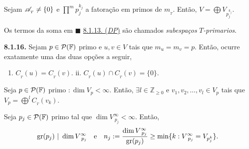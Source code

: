 \hypertarget{thmDP}{}
\begin{theorem}
    \label{thm:8.1.13}
    Sejam \(\mathscr{A}_{_T}\neq \{0\}\) e \(\prod^m p_j^{k_j}\) a fatoração em primos de \(m_{_T}\). Então, \(V= \bigoplus V_{p_j^{k_j}}\). 
\end{theorem}


\begin{note}
    Os termos da soma em \(\blacksquare\) \hyperlink{thmDP}{8.1.13. (\emph{DP})} são chamados \emph{subespaços} \(T\)\emph{-primarios}.
\end{note}


\hypertarget{lemma8116}{}
\begin{lemma}
    \textbf{8.1.16.} Sejam \(p\in \mathcal{P}(\mathbb{F})\) primo e \(u,v\in V\) tais que \(m_u = m_v = p \). Então, ocurre exatamente uma das duas opções a seguir,
    \begin{enumerate}[label = \roman*., left=2.5cm]
        \item \(C_{_T}(u) = C_{_T}(v)\). \hspace{2cm} ii. \(C_{_T}(u) \cap C_{_T}(v) = \{0\}\). 
    \end{enumerate} 
\end{lemma}



\begin{proposition}
    Seja \(p\in \mathcal{P}(\mathbb{F})\) primo \(: \dim V_p <\infty \). Então, \(\exists l\in \mathbb{Z}_{\geq 0}\) e \(v_1, v_2, \ldots, v_l \in V_p\) tais que \(V_p = \bigoplus^l C_{_T}(v_k) \). 
\end{proposition}


\begin{proposition}
    Seja \(p_j\in \mathcal{P}(\mathbb{F})\) primo tal que \(\dim V_{\ p_j}^\infty < \infty\). Então, 
    \[\operatorname{gr}(p_j)\ | \ \dim V_{\ p_j}^\infty \text{  \ \ e \ \  } n_j := \frac{\dim V_{\ p_j}^\infty}{\operatorname{gr}(p_j)} \geq \min\{k: V_{\ p_j}^\infty = V_{p_j^k}\}.\] 
\end{proposition}

